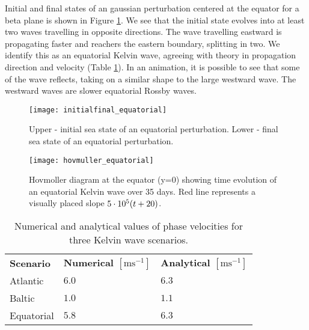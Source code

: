 Initial and final states of an gaussian perturbation centered at the equator for a beta plane is shown in Figure \ref{fig:initialfinal_equatorial}. We see that the initial state evolves into at least two waves travelling in opposite directions. The wave travelling eastward is propagating faster and reachers the eastern boundary, splitting in two. We identify this as an equatorial Kelvin wave, agreeing with theory in propagation direction and velocity (Table \ref{tab:velocities}). In an animation, it is possible to see that some of the wave reflects, taking on a similar shape to the large westward wave. The westward waves are slower equatorial Rossby waves.
	\begin{figure}[htbp]
		\centering
		\texttt{[image: initialfinal\_equatorial]}
		\caption{Upper - initial sea state of an equatorial perturbation. Lower - final sea state of an equatorial perturbation.}
		\label{fig:initialfinal_equatorial}
	\end{figure}

	\begin{figure}[htbp]
		\centering
		\texttt{[image: hovmuller\_equatorial]}
		\caption{Hovmoller diagram at the equator (y=0) showing time evolution of an equatorial Kelvin wave over 35 days. Red line represents a visually placed slope $5 \cdot 10^5\qty(t + 20)$.}
		\label{fig:equatorial}
	\end{figure}


	\begin{table}[htbp]
		\begin{tabular}{lll}
			\textbf{Scenario} &\textbf{Numerical $[\text{m}\text{s}^{-1}]$} & \textbf{Analytical $[\text{m}\text{s}^{-1}]$} \\
			Atlantic & $ 6.0 $ & $ 6.3 $ \\
			Baltic & $ 1.0 $ & $ 1.1 $ \\
			Equatorial & $ 5.8 $ & $ 6.3 $
		\end{tabular}
		\caption{Numerical and analytical values of phase velocities for three Kelvin wave scenarios.}
		\label{tab:velocities}
	\end{table}